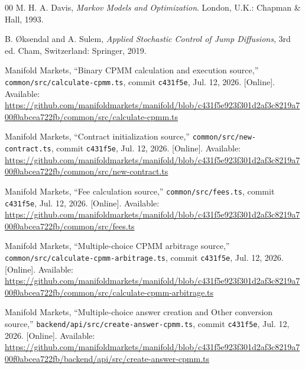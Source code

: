 \documentclass[journal,a4paper]{IEEEtran}
\begin{document}
\begin{thebibliography}{00}
M. H. A. Davis, \emph{Markov Models and Optimization}. London, U.K.: Chapman \& Hall, 1993.

B. \O ksendal and A. Sulem, \emph{Applied Stochastic Control of Jump Diffusions}, 3rd ed. Cham, Switzerland: Springer, 2019.

Manifold Markets, ``Binary CPMM calculation and execution source,'' \texttt{common/src/calculate-cpmm.ts}, commit \texttt{c431f5e}, Jul. 12, 2026. [Online]. Available: \url{https://github.com/manifoldmarkets/manifold/blob/c431f5e923f301d2af3c8219a700f0abcea722fb/common/src/calculate-cpmm.ts}

Manifold Markets, ``Contract initialization source,'' \texttt{common/src/new-contract.ts}, commit \texttt{c431f5e}, Jul. 12, 2026. [Online]. Available: \url{https://github.com/manifoldmarkets/manifold/blob/c431f5e923f301d2af3c8219a700f0abcea722fb/common/src/new-contract.ts}

Manifold Markets, ``Fee calculation source,'' \texttt{common/src/fees.ts}, commit \texttt{c431f5e}, Jul. 12, 2026. [Online]. Available: \url{https://github.com/manifoldmarkets/manifold/blob/c431f5e923f301d2af3c8219a700f0abcea722fb/common/src/fees.ts}

Manifold Markets, ``Multiple-choice CPMM arbitrage source,'' \texttt{common/src/calculate-cpmm-arbitrage.ts}, commit \texttt{c431f5e}, Jul. 12, 2026. [Online]. Available: \url{https://github.com/manifoldmarkets/manifold/blob/c431f5e923f301d2af3c8219a700f0abcea722fb/common/src/calculate-cpmm-arbitrage.ts}

Manifold Markets, ``Multiple-choice answer creation and Other conversion source,'' \texttt{backend/api/src/create-answer-cpmm.ts}, commit \texttt{c431f5e}, Jul. 12, 2026. [Online]. Available: \url{https://github.com/manifoldmarkets/manifold/blob/c431f5e923f301d2af3c8219a700f0abcea722fb/backend/api/src/create-answer-cpmm.ts}

\end{thebibliography}
\end{document}
